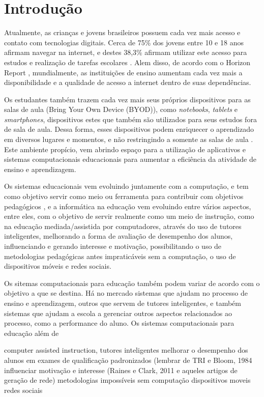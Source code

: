 \chapter{Introdução}
\label{cap:introducao}

Atualmente, as crianças e jovens brasileiros possuem cada vez mais acesso e contato
com tecnologias digitais. Cerca de 75\% dos jovens entre 10 e 18 anos afirmam navegar
na internet, e destes 38,3\% afirmam utilizar este acesso para estudos e realização de tarefas
escolares \cite{escola_futuro:2012}. Alem disso, de acordo com o Horizon Report \cite{horizon:2012}, mundialmente, as instituições de ensino aumentam cada vez mais a disponibilidade e a qualidade de acesso a internet dentro de suas dependências.

Os estudantes também trazem cada vez mais seus próprios dispositivos para as salas de
aula (Bring Your Own Device (BYOD)), como \emph{notebooks}, \emph{tablets} e \emph{smartphones}, dispositivos estes que também são utilizados para seus estudos fora de sala de aula. Dessa forma,
esses dispositivos podem enriquecer o aprendizado em diversos lugares e momentos, e não restringindo a
somente as salas de aula \cite{horizon_k12:2014}. Este ambiente propício, vem abrindo espaço para a utilização de aplicativos e sistemas computacionais educacionais para aumentar a eficiência da atividade de ensino e aprendizagem. 

Os sistemas educacionais vem evoluindo juntamente com a computação, e tem como objetivo servir como meio ou ferramenta para contribuir com objetivos pedagógicos \cite{tchounikine11}, e a informática na educação vem evoluindo entre vários aspectos, entre eles, com o objetivo de servir realmente como um meio de instrução, como na educação mediada/assistida por computadores, através do uso de tutores inteligentes, melhorando a forma de avaliação de desempenho dos alunos, influenciando e gerando interesse e motivação, possibilitando o uso de metodologias pedagógicas antes impraticáveis sem a computação, o uso de dispositivos móveis e redes sociais.

Os sitemas computacionais para educação também podem variar de acordo com o objetivo a que se destina. Há no mercado sistemas que ajudam no processo de ensino e aprendizagem, outros que servem de tutores inteligentes, e também sistemas que ajudam a escola a gerenciar outros aspectos relacionados ao processo, como a performance do aluno. Os sistemas computacionais para educação além de 

computer assisted instruction, 
tutores inteligentes
melhorar o desempenho dos alunos em exames de qualificação padronizados (lembrar de TRI e Bloom, 1984
influenciar motivação e interesse (Raines e Clark, 2011 e aqueles artigos de geração de rede)
metodologias impossíveis sem computação
dispositivos moveis
redes sociais

